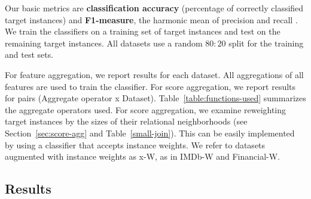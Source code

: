 \documentclass[conference]{IEEEtran}
\begin{document}
%



Our basic metrics are \textbf{classification accuracy} (percentage of correctly classified target instances) and \textbf{F1-measure}, the harmonic mean of precision and recall \cite{Witten2005}. We train the classifiers on a training set of target instances and test on the remaining target instances. All datasets use a random $80:20$ split for the training and test sets.

For feature aggregation, we report results for each dataset. All aggregations of all features are used to train the classifier. For score aggregation, we report results for pairs (Aggregate operator x Dataset). Table~\ref{table:functions-used} summarizes the aggregate operators used.
%
For score aggregation, we examine reweighting target instances by the sizes of their relational neighborhoods (see Section~\ref{sec:score-agg} and Table~\ref{small-join}). This can be easily implemented by using a classifier that accepts instance weights. We refer to datasets augmented with instance weights as x-W, as in IMDb-W and Financial-W.

\subsection{Results}
\end{document}
